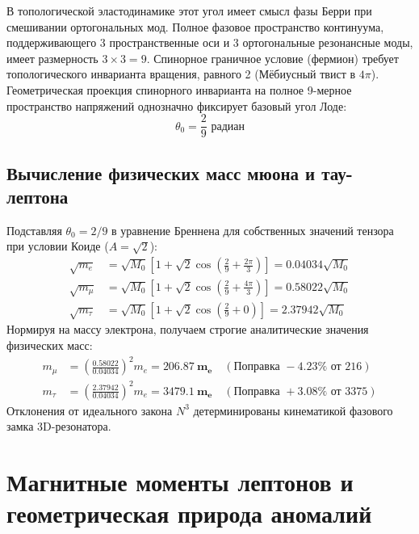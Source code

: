 \documentclass[12pt,a4paper]{article}
\begin{document}
	В топологической эластодинамике этот угол имеет смысл фазы Берри при смешивании ортогональных мод. Полное фазовое пространство континуума, поддерживающего 3 пространственные оси и 3 ортогональные резонансные моды, имеет размерность $3 \times 3 = 9$. Спинорное граничное условие (фермион) требует топологического инварианта вращения, равного 2 (Мёбиусный твист в $4\pi$). 
	Геометрическая проекция спинорного инварианта на полное 9-мерное пространство напряжений однозначно фиксирует базовый угол Лоде:
	\begin{equation}
		\theta_0 = \frac{2}{9} \text{ радиан}
	\end{equation}
	
	\subsection{Вычисление физических масс мюона и тау-лептона}
	Подставляя $\theta_0 = 2/9$ в уравнение Бреннена для собственных значений тензора при условии Коиде ($A = \sqrt{2}$):
	\begin{align}
		\sqrt{m_e} &= \sqrt{M_0} \left[ 1 + \sqrt{2}\cos\left(\frac{2}{9} + \frac{2\pi}{3}\right) \right] = 0.04034 \sqrt{M_0} \\
		\sqrt{m_\mu} &= \sqrt{M_0} \left[ 1 + \sqrt{2}\cos\left(\frac{2}{9} + \frac{4\pi}{3}\right) \right] = 0.58022 \sqrt{M_0} \\
		\sqrt{m_\tau} &= \sqrt{M_0} \left[ 1 + \sqrt{2}\cos\left(\frac{2}{9} + 0\right) \right] = 2.37942 \sqrt{M_0}
	\end{align}
	Нормируя на массу электрона, получаем строгие аналитические значения физических масс:
	\begin{align}
		m_\mu &= \left(\frac{0.58022}{0.04034}\right)^2 m_e = \mathbf{206.87 \ m_e} \quad (\text{Поправка } -4.23\% \text{ от } 216) \\
		m_\tau &= \left(\frac{2.37942}{0.04034}\right)^2 m_e = \mathbf{3479.1 \ m_e} \quad (\text{Поправка } +3.08\% \text{ от } 3375)
	\end{align}
	Отклонения от идеального закона $N^3$ детерминированы кинематикой фазового замка 3D-резонатора.
	
	\section{Магнитные моменты лептонов и геометрическая природа аномалий}
	
\end{document}
